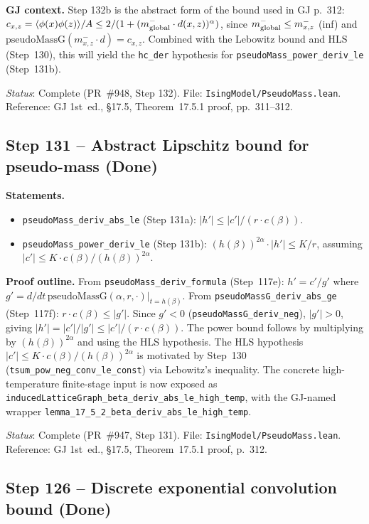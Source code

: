\documentclass[a4paper,11pt]{article}
\begin{document}
\noindent\textbf{GJ context.} Step 132b is the abstract form of the bound used in GJ p.~312:
$c_{x,z}=\langle\phi(x)\phi(z)\rangle/A\leq 2/(1+(m^-_{\rm global}\cdot d(x,z))^\alpha)$,
since $m^-_{\rm global}\leq m^-_{x,z}$ (inf) and $\mathrm{pseudoMassG}(m^-_{x,z}\cdot d)=c_{x,z}$.
Combined with the Lebowitz bound and HLS (Step~130), this will yield the \texttt{hc\_der}
hypothesis for \texttt{pseudoMass\_power\_deriv\_le} (Step~131b).

\noindent\textit{Status}: Complete (PR~\#948, Step 132).
File: \texttt{IsingModel/PseudoMass.lean}.
Reference: GJ 1st~ed., \S17.5, Theorem~17.5.1 proof, pp.~311--312.

\subsection*{Step 131 -- Abstract Lipschitz bound for pseudo-mass (Done)}

\noindent\textbf{Statements.}
\begin{itemize}
  \item \texttt{pseudoMass\_deriv\_abs\_le} (Step 131a):
    $|h'| \leq |c'| / (r \cdot c(\beta))$.
  \item \texttt{pseudoMass\_power\_deriv\_le} (Step 131b):
    $(h(\beta))^{2\alpha} \cdot |h'| \leq K/r$,
    assuming $|c'| \leq K \cdot c(\beta) / (h(\beta))^{2\alpha}$.
\end{itemize}

\noindent\textbf{Proof outline.}
From \texttt{pseudoMass\_deriv\_formula} (Step~117e): $h' = c'/g'$ where
$g' = d/dt\,\mathrm{pseudoMassG}(\alpha, r, \cdot)|_{t=h(\beta)}$.
From \texttt{pseudoMassG\_deriv\_abs\_ge} (Step~117f): $r \cdot c(\beta) \leq |g'|$.
Since $g' < 0$ (\texttt{pseudoMassG\_deriv\_neg}), $|g'| > 0$, giving
$|h'| = |c'|/|g'| \leq |c'|/(r \cdot c(\beta))$.
The power bound follows by multiplying by $(h(\beta))^{2\alpha}$ and using the HLS hypothesis.
The HLS hypothesis $|c'| \leq K \cdot c(\beta)/(h(\beta))^{2\alpha}$ is motivated by
Step~130 (\texttt{tsum\_pow\_neg\_conv\_le\_const}) via Lebowitz's inequality.
The concrete high-temperature finite-stage input is now exposed as
\texttt{inducedLatticeGraph\_beta\_deriv\_abs\_le\_high\_temp}, with the
GJ-named wrapper
\texttt{lemma\_17\_5\_2\_beta\_deriv\_abs\_le\_high\_temp}.

\noindent\textit{Status}: Complete (PR~\#947, Step 131).
File: \texttt{IsingModel/PseudoMass.lean}.
Reference: GJ 1st~ed., \S17.5, Theorem~17.5.1 proof, p.~312.

\subsection*{Step 126 -- Discrete exponential convolution bound (Done)}
\end{document}
